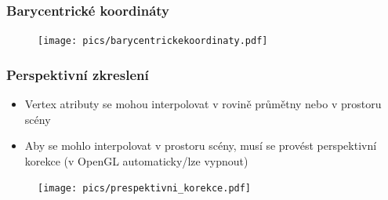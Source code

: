 \begin{frame}
\frametitle{Barycentrické koordináty}
	\begin{figure}[h]
		\texttt{[image: pics/barycentrickekoordinaty.pdf]}
	\end{figure}
\end{frame}

\begin{frame}
\frametitle{Perspektivní zkreslení}
	\begin{itemize}
		\item Vertex atributy se mohou interpolovat v rovině průmětny nebo v prostoru scény
    \item Aby se mohlo interpolovat v prostoru scény, musí se provést perspektivní korekce
      (v OpenGL automaticky/lze vypnout)
	\end{itemize}
	\begin{figure}[h]
		\texttt{[image: pics/prespektivni\_korekce.pdf]}
	\end{figure}
\end{frame}


